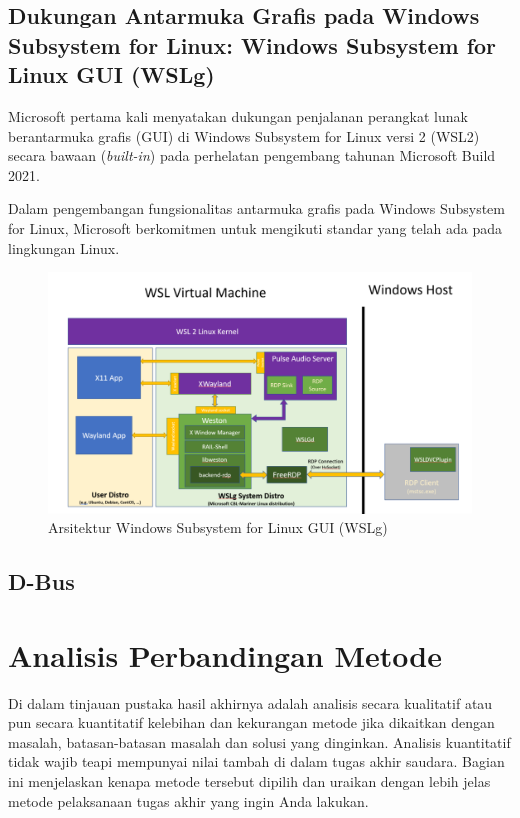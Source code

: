 \subsection{Dukungan Antarmuka Grafis pada Windows Subsystem for Linux: Windows Subsystem for Linux GUI (WSLg)}

Microsoft pertama kali menyatakan dukungan penjalanan perangkat lunak berantarmuka grafis (GUI) di Windows Subsystem for Linux versi 2 (WSL2) secara bawaan (\textit{built-in}) pada perhelatan pengembang tahunan Microsoft Build 2021.

Dalam pengembangan fungsionalitas antarmuka grafis pada Windows Subsystem for Linux, Microsoft berkomitmen untuk mengikuti standar yang telah ada pada lingkungan Linux.

\begin{figure}
    \centering
    \includegraphics[width=0.5\linewidth]{wslg-architecture.png}
    \caption{Arsitektur Windows Subsystem for Linux GUI (WSLg)}
    \label{fig:enter-label}
\end{figure}


\subsection{D-Bus}

\subsection{}

\section{Analisis Perbandingan Metode}

Di dalam tinjauan pustaka hasil akhirnya adalah analisis secara kualitatif atau pun secara kuantitatif kelebihan dan kekurangan metode jika dikaitkan dengan masalah, batasan-batasan masalah dan solusi yang dinginkan. Analisis kuantitatif tidak wajib teapi mempunyai nilai tambah di dalam tugas akhir saudara. Bagian ini menjelaskan kenapa metode tersebut dipilih dan uraikan dengan lebih jelas metode pelaksanaan tugas akhir yang ingin Anda lakukan. 

